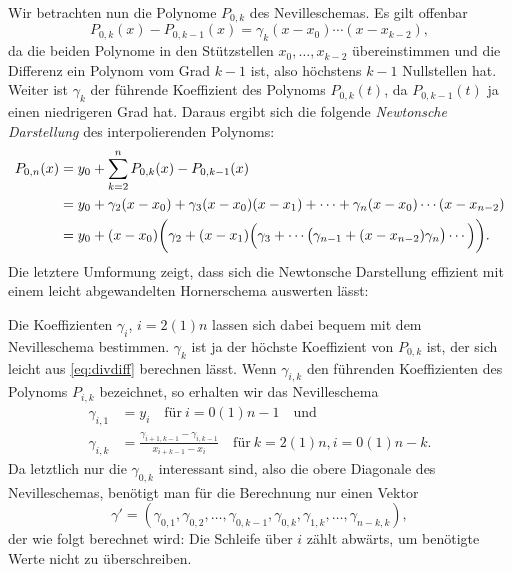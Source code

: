 Wir betrachten nun die Polynome $P_{0,k}$ des Nevilleschemas. Es gilt
offenbar
\begin{equation}
  P_{0,k}(x) - P_{0,k-1}(x) = \gamma_k(x-x_0)\cdots(x-x_{k-2}),
\end{equation}
da die beiden Polynome in den Stützstellen $x_0,\ldots,x_{k-2}$
übereinstimmen und die Differenz ein Polynom vom Grad $k-1$ ist, also
höchstens $k-1$ Nullstellen hat. Weiter ist $\gamma_k$ der führende
Koeffizient des Polynoms $P_{0,k}(t)$, da $P_{0,k-1}(t)$ ja einen
niedrigeren Grad hat. Daraus ergibt sich die folgende \emph{Newtonsche
  Darstellung} des interpolierenden Polynoms:
\begin{equation}
  \begin{split}
    P_{0,n}(x) &= y_0 + \sum_{k=2}^{n} P_{0,k}(x) - P_{0,k-1}(x)\\
    &= y_0 + \gamma_2(x-x_0) + \gamma_3(x-x_0)(x-x_1) + \cdots
    + \gamma_n(x-x_0)\cdots(x-x_{n-2})\\
    &= y_0 + (x-x_0)\biggl(\gamma_2 + (x-x_1)\Bigl(\gamma_3 + \cdots
    \bigl(\gamma_{n-1} + (x-x_{n-2})\gamma_n\bigr)\cdots\Bigr)\biggr).
  \end{split}
\end{equation}
Die letztere Umformung zeigt, dass sich die Newtonsche Darstellung
effizient mit einem leicht abgewandelten Hornerschema auswerten lässt:


Die Koeffizienten $\gamma_i$, $i=2(1)n$ lassen sich dabei bequem mit
dem Nevilleschema bestimmen. $\gamma_k$ ist ja der höchste Koeffizient
von $P_{0,k}$ ist, der sich leicht aus \eqref{eq:divdiff} berechnen
lässt. Wenn $\gamma_{i,k}$ den führenden Koeffizienten des Polynoms
$P_{i,k}$ bezeichnet, so erhalten wir das Nevilleschema
\begin{align}
  \gamma_{i,1} &= y_i \quad\text{für}~ i=0(1)n-1\quad\text{und}\\
  \gamma_{i,k}&= \frac{\gamma_{i+1,k-1} - \gamma_{i,k-1}}{x_{i+k-1} -
    x_i}
  \quad\text{für}~ k=2(1)n, i=0(1)n-k.
\end{align}
Da letztlich nur die $\gamma_{0,k}$ interessant sind, also die obere
Diagonale des Nevilleschemas, benötigt man für die Berechnung nur
einen Vektor
\begin{equation}
  \gamma' = \left(\gamma_{0,1},\gamma_{0,2},\ldots,\gamma_{0,k-1},
    \gamma_{0,k},\gamma_{1,k},\ldots,\gamma_{n-k,k}\right),
\end{equation}
der wie folgt berechnet wird:
%
Die Schleife über $i$ zählt abwärts, um benötigte Werte nicht zu
überschreiben.

